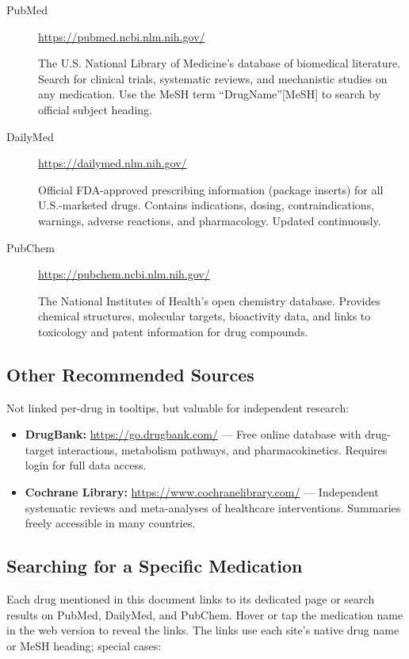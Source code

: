 \begin{description}
\item[PubMed] \hfill \url{https://pubmed.ncbi.nlm.nih.gov/}

The U.S. National Library of Medicine's database of biomedical literature. Search for clinical trials, systematic reviews, and mechanistic studies on any medication. Use the MeSH term ``DrugName''[MeSH] to search by official subject heading.

\item[DailyMed] \hfill \url{https://dailymed.nlm.nih.gov/}

Official FDA-approved prescribing information (package inserts) for all U.S.-marketed drugs. Contains indications, dosing, contraindications, warnings, adverse reactions, and pharmacology. Updated continuously.

\item[PubChem] \hfill \url{https://pubchem.ncbi.nlm.nih.gov/}

The National Institutes of Health's open chemistry database. Provides chemical structures, molecular targets, bioactivity data, and links to toxicology and patent information for drug compounds.
\end{description}

\subsection{Other Recommended Sources}

Not linked per-drug in tooltips, but valuable for independent research:

\begin{itemize}
\item \textbf{DrugBank:} \url{https://go.drugbank.com/} --- Free online database with drug-target interactions, metabolism pathways, and pharmacokinetics. Requires login for full data access.
\item \textbf{Cochrane Library:} \url{https://www.cochranelibrary.com/} --- Independent systematic reviews and meta-analyses of healthcare interventions. Summaries freely accessible in many countries.
\end{itemize}

\subsection{Searching for a Specific Medication}

Each drug mentioned in this document links to its dedicated page or search results on PubMed, DailyMed, and PubChem. Hover or tap the medication name in the web version to reveal the links. The links use each site's native drug name or MeSH heading; special cases:

